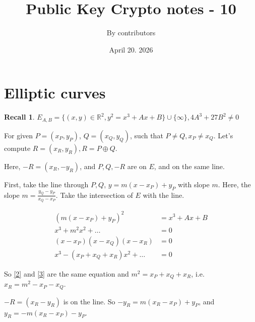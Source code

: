 \documentclass[11pt]{article}
\theoremstyle{definition}
\newtheorem{recall}{Recall}[section]
\theoremstyle{proof}
\begin{document}
\title{Public Key Crypto notes - 10}
\author{By contributors}
\date{April 20. 2026}
\maketitle

\section{Elliptic curves}

\begin{recall}
	$E_{A, B} = \{(x, y) \in \mathbb{R}^2, y^2 = x^3 + Ax + B\} \cup \{\infty\}, 4A^3 + 27B^2 \ne 0$
\end{recall}

For given $P = (x_P, y_P)$, $Q = (x_Q, y_Q)$, such that $P \ne Q, x_P \ne x_Q$. Let's compute $R = (x_R, y_R), R = P \oplus Q$.

Here, $-R = (x_R, -y_R)$, and $P, Q, -R$ are on $E$, and on the same line.

First, take the line through $P, Q$, $y = m(x-x_P) + y_P$ with slope $m$. Here, the slope $m = \frac{y_Q - y_P}{x_Q - x_P}$. Take the intersection of $E$ with the line.

\begin{align}
	(m (x-x_P) + y_P)^2 &= x^3 + Ax + B \\
	x^3 + m^2x^2 + \dots &= 0 \label{2}\\
	(x-x_P) (x-x_Q) (x-x_R) &= 0 \label{3}\\
	x^3 - (x_P + x_Q + x_R) x^2 + \dots &= 0
\end{align}

So \eqref{2} and \eqref{3} are the same equation and $m^2 = x_P + x_Q + x_R$, i.e. $x_R = m^2 - x_P - x_Q$.

$-R = (x_R - y_R)$ is on the line. So $-y_R = m(x_R - x_P) + y_P$, and $y_R = -m(x_R - x_P) - y_P$.
\end{document}
